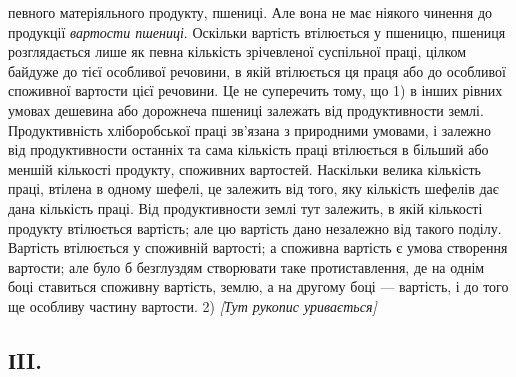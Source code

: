 \parcont{}  %
певного матеріяльного продукту, пшениці. Але вона не має ніякого чинення до продукції
\emph{вартости пшениці}. Оскільки вартість втілюється у пшеницю, пшениця
розглядається лише як певна кількість зрічевленої суспільної праці, цілком
байдуже до тієї особливої речовини, в якій втілюється ця праця або до особливої
споживної вартости цієї речовини. Це не суперечить тому, що 1) в інших рівних
умовах дешевина або дорожнеча пшениці залежать від продуктивности землі. Продуктивність
хліборобської праці зв’язана з природними умовами, і залежно від продуктивности
останніх та сама кількість праці втілюється в більший або меншій кількості
продукту, споживних вартостей. Наскільки велика кількість праці, втілена в
одному шефелі, це залежить від того, яку кількість шефелів дає дана кількість праці.
Від продуктивности землі тут залежить, в якій кількості продукту втілюється вартість;
але цю вартість дано незалежно від такого поділу. Вартість втілюється
у споживній вартості; а споживна вартість є умова створення вартости; але
було б безглуздям створювати таке протиставлення, де на однім боці ставиться
споживну вартість, землю, а на другому боці — вартість, і до того ще особливу
частину вартости. 2) \emph{[Тут рукопис уривається]}

\subsection*{ІII.}

